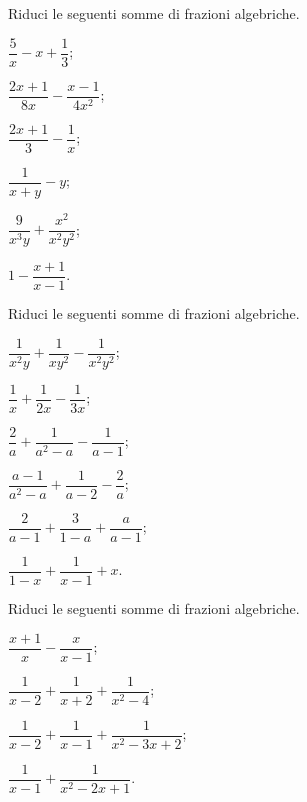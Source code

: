 \begin{esercizio}
\label{ese:19.27}
Riduci le seguenti somme di frazioni algebriche.
\begin{multicols}{3}
\begin{enumeratea}
 \item $\dfrac{5}{x}-x+\dfrac{1}{3}$;
 \item $\dfrac{2x+1}{8x}-\dfrac{x-1}{4x^{2}}$;
 \item $\dfrac{2x+1}{3}-\dfrac{1}{x}$;
 \item $\dfrac{1}{x+y}-y$;
 \item $\dfrac{9}{x^{3}y}+\dfrac{x^{2}}{x^{2}y^{2}}$;
 \item $1-\dfrac{x+1}{x-1}$.
\end{enumeratea}
\end{multicols}
\end{esercizio}

\begin{esercizio}[\Ast]
\label{ese:19.28}
Riduci le seguenti somme di frazioni algebriche.
\begin{multicols}{3}
\begin{enumeratea}
 \item $\dfrac{1}{x^{2}y}+\dfrac{1}{xy^{2}}-\dfrac{1}{x^{2}y^{2}}$;
 \item $\dfrac{1}{x}+\dfrac{1}{2x}-\dfrac{1}{3x}$;
 \item $\dfrac{2}{a}+\dfrac{1}{a^{{2}}-a}-\dfrac{1}{a-1}$;
 \item $\dfrac{a-1}{a^{2}-a}+\dfrac{1}{a-2}-\dfrac{2}{a}$;
 \item $\dfrac{2}{a-1}+\dfrac{3}{1-a}+\dfrac{a}{a-1}$;
 \item $\dfrac{1}{1-x}+\dfrac{1}{x-1}+x$.
\end{enumeratea}
\end{multicols}
\end{esercizio}

\begin{esercizio}[\Ast]
\label{ese:19.29}
Riduci le seguenti somme di frazioni algebriche.
\begin{multicols}{2}
\begin{enumeratea}
 \item $\dfrac{x+1}{x}-\dfrac{x}{x-1}$;
 \item $\dfrac{1}{x-2}+\dfrac{1}{x+2}+\dfrac{1}{x^{{2}}-4}$;
 \item $\dfrac{1}{x-2}+\dfrac{1}{x-1}+\dfrac{1}{x^{{2}}-3x+2}$;
 \item $\dfrac{1}{x-1}+\dfrac{1}{x^{2}-2x+1}$.
\end{enumeratea}
\end{multicols}
\end{esercizio}

